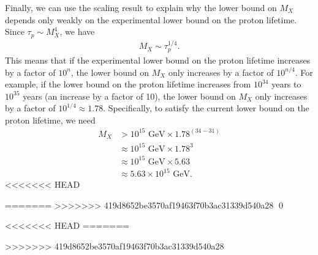 Finally, we can use the scaling result to explain why the lower bound on $M_X$ depends only weakly on the experimental lower bound on the proton lifetime. Since $\tau_p \sim M_X^4$, we have
\begin{align}
    M_X \sim \tau_p^{1/4}.
\end{align}
This means that if the experimental lower bound on the proton lifetime increases by a factor of $10^n$, the lower bound on $M_X$ only increases by a factor of $10^{n/4}$. For example, if the lower bound on the proton lifetime increases from $10^{34}$ years to $10^{35}$ years (an increase by a factor of 10), the lower bound on $M_X$ only increases by a factor of $10^{1/4} \approx 1.78$. Specifically, to satisfy the current lower bound on the proton lifetime, we need
\begin{align}
    M_X &> 10^{15} \text{ GeV} \times 1.78^{(34-31)} \\
    &\approx 10^{15} \text{ GeV} \times 1.78^{3} \\
    &\approx 10^{15} \text{ GeV} \times 5.63 \\
    &\approx 5.63 \times 10^{15} \text{ GeV}.
\end{align}
<<<<<<< HEAD

=======
>>>>>>> 419d8652be3570af19463f70b3ac31339d540a28
\qed



<<<<<<< HEAD
=======

>>>>>>> 419d8652be3570af19463f70b3ac31339d540a28
